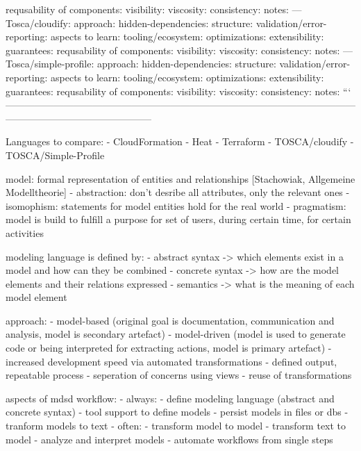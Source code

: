   requsability of components:
  visibility:
  viscosity:
  consistency:
  notes:
---
Tosca/cloudify:
  approach:
  hidden-dependencies:
  structure:
  validation/error-reporting:
  aspects to learn:
  tooling/ecosystem:
  optimizations:
  extensibility:
  guarantees:
  requsability of components:
  visibility:
  viscosity:
  consistency:
  notes:
---
Tosca/simple-profile:
  approach:
  hidden-dependencies:
  structure:
  validation/error-reporting:
  aspects to learn:
  tooling/ecosystem:
  optimizations:
  extensibility:
  guarantees:
  requsability of components:
  visibility:
  viscosity:
  consistency:
  notes:
```
---------------------------------------------------------------------------------------------------------------------------------------------------------


Languages to compare:
- CloudFormation
- Heat
- Terraform
- TOSCA/cloudify
- TOSCA/Simple-Profile

model: formal representation of entities and relationships [Stachowiak, Allgemeine Modelltheorie]
  - abstraction: don't desribe all attributes, only the relevant ones
  - isomophism: statements for model entities hold for the real world
  - pragmatism: model is build to fulfill a purpose for set of users, during certain time, for certain activities

modeling language is defined by:
- abstract syntax -> which elements exist in a model and how can they be combined
- concrete syntax -> how are the model elements and their relations expressed
- semantics -> what is the meaning of each model element

approach:
- model-based (original goal is documentation, communication and analysis, model is secondary artefact)
- model-driven (model is used to generate code or being interpreted for extracting actions, model is primary artefact)
  - increased development speed via automated transformations
  - defined output, repeatable process
  - seperation of concerns using views
  - reuse of transformations

aspects of mdsd workflow:
- always:
  - define modeling language (abstract and concrete syntax)
  - tool support to define models
  - persist models in files or dbs
  - tranform models to text
- often:
  - transform model to model
  - transform text to model
  - analyze and interpret models
  - automate workflows from single steps


